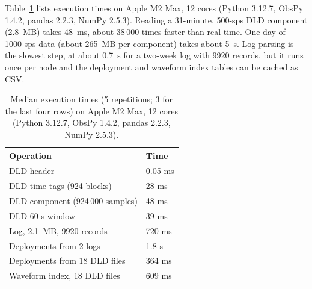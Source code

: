 Table~\ref{tab:perf} lists execution times on Apple M2 Max, 12 cores (Python 3.12.7, ObsPy 1.4.2, pandas 2.2.3, NumPy 2.5.3). Reading a 31-minute, 500-sps DLD component (2.8~MB) takes 48~ms, about 38\,000 times faster than real time. One day of 1000-sps data (about 265~MB per component) takes about 5~s. Log parsing is the slowest step, at about 0.7~s for a two-week log with 9920 records, but it runs once per node and the deployment and waveform index tables can be cached as CSV.

\begin{table}[ht!]
\seismicatablestyle
\begin{tabular}{m{4.9cm} m{2.4cm}}
Operation & Time \\
\hline
DLD header & 0.05 ms \\
DLD time tags (924 blocks) & 28 ms \\
DLD component (924\,000 samples) & 48 ms \\
DLD 60-s window & 39 ms \\
Log, 2.1~MB, 9920 records & 720 ms \\
Deployments from 2 logs & 1.8 s \\
Deployments from 18 DLD files & 364 ms \\
Waveform index, 18 DLD files & 609 ms \\
\end{tabular}
\caption{Median execution times (5 repetitions; 3 for the last four rows) on Apple M2 Max, 12 cores (Python 3.12.7, ObsPy 1.4.2, pandas 2.2.3, NumPy 2.5.3).}
\label{tab:perf}
\end{table}

